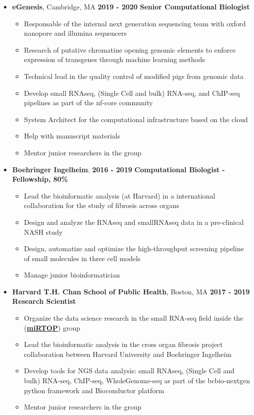 \begin{itemize}
\item
\textbf{eGenesis}, Cambridge, MA \hfill \textbf{2019 - 2020}
\newline
\textbf{Senior Computational Biologist}
 \begin{itemize}

\item
  Responsable of the internal next generation sequencing team with oxford nanopore and illumina sequencers
\item
  Research of putative chromatine opening genomic elements to enforce expression of transgenes through machine learning methods
\item
  Technical lead in the quality control of modified pigs from genomic data
\item 
  Develop small RNAseq, (Single Cell and bulk) RNA-seq, and ChIP-seq pipelines
  as part of the nf-core community
\item 
  System Architect for the computational infrastructure based on the cloud
\item
  Help with manuscript materials
\item Mentor junior researchers in the group
 \end{itemize}

\item
  \textbf{Boehringer Ingelheim}, \hfill \textbf{2016 - 2019}
  \newline
  \textbf{Computational Biologist - Fellowship, 80\%}
 \begin{itemize}
  \item  Lead the bioinformatic analysis (at Harvard) in a international collaboration for the study of fibrosis across organs 
  \item Design and analyze the RNAseq and smallRNAseq data in a pre-clinical NASH study
  \item Design, automatize and optimize the high-throughput screening pipeline of small molecules in three cell models
  \item Manage junior bioinformatician
\end{itemize}

\item
  \textbf{Harvard T.H. Chan School of Public Health}, Boston, MA \hfill \textbf{2017 - 2019}
  \newline
  \textbf{Research Scientist}
 \begin{itemize}
  \item
    Organize the data science research in the small RNA-seq field inside the  (\href{https://mirtop.github.com}{\textbf{miRTOP}}) group
  \item
    Lead the bioinformatic analysis in the cross organ fibrosis project
    collaboration between Harvard University and Boehringer Ingelheim
  \item
    Develop tools for NGS data analysis: small RNAseq, (Single
    Cell and bulk) RNA-seq, ChIP-seq, WholeGenome-seq as part of the bcbio-nextgen
    python framework and Bioconductor platform
  \item Mentor junior researchers in the group
\end{itemize}


\end{itemize}
